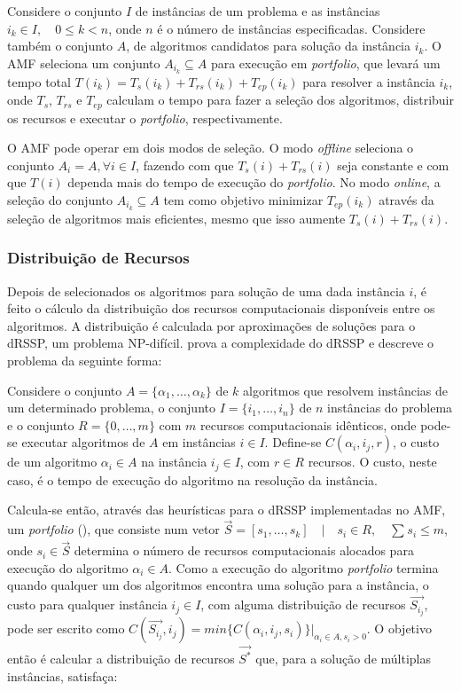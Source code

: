 \documentclass[a4paper, 12pt]{article}
\begin{document}
Considere o conjunto $I$ de instâncias de um problema e as instâncias $i_k \in
I, \quad 0 \leq k < n$, onde $n$ é o número de instâncias especificadas.
Considere também o conjunto $A$, de algoritmos candidatos para solução da
instância $i_k$. O AMF seleciona um conjunto $A_{i_k} \subseteq A$ para
execução em \emph{portfolio}, que levará um tempo total $T(i_k) =
T_s(i_k) + T_{rs}(i_k) + T_{ep}(i_k)$ para resolver a instância $i_k$,
onde $T_s$, $T_{rs}$ e $T_{ep}$ calculam o tempo para fazer a seleção
dos algoritmos, distribuir os recursos e executar o \emph{portfolio},
respectivamente.

O AMF pode operar em dois modos de seleção. O modo \emph{offline}
seleciona o conjunto $A_{i} = A, \forall i \in I$, fazendo com que
$T_s(i) + T_{rs}(i)$ seja constante e com que $T(i)$ dependa mais
do tempo de execução do \emph{portfolio}. No modo \emph{online},
a seleção do conjunto $A_{i_k} \subseteq A$ tem como objetivo minimizar
$T_{ep}(i_k)$ através da seleção de algoritmos mais eficientes, mesmo
que isso aumente $T_s(i) + T_{rs}(i)$.

\subsubsection{Distribuição de Recursos} \label{sec:drssp}

Depois de selecionados os algoritmos para solução de uma dada instância $i$,
é feito o cálculo da distribuição dos recursos computacionais disponíveis entre
os algoritmos. A distribuição é calculada por aproximações de soluções para
o dRSSP, um problema NP-difícil. \citet{bougeret2011approximating} prova a
complexidade do dRSSP e descreve o problema da seguinte forma:

Considere o conjunto $A = \{\alpha_1, \dots, \alpha_k\}$ de $k$ algoritmos que
resolvem instâncias de um determinado problema, o conjunto $I = \{i_1, \dots,
i_n\}$ de $n$ instâncias do problema e o conjunto $R = \{0, \dots, m\}$ com
$m$ recursos computacionais idênticos, onde pode-se executar algoritmos de $A$
em instâncias $i \in I$. Define-se $C(\alpha_i,i_j,r)$, o custo
de um algoritmo $\alpha_i \in A$ na instância $i_j \in I$, com $r \in R$
recursos. O custo, neste caso, é o tempo de execução do
algoritmo na resolução da instância.

Calcula-se então, através das heurísticas para o dRSSP implementadas no AMF,
um \emph{portfolio} (\citet{huberman1997economics}),
que consiste num vetor $\overrightarrow{S} = [s_1, \dots, s_k] \quad | \quad
s_i \in R, \quad \sum_{} s_i \leq m$, onde $s_i \in \overrightarrow{S}$
determina o número de recursos computacionais alocados para execução
do algoritmo $\alpha_i \in A$. Como a execução do algoritmo
\emph{portfolio} termina quando qualquer um dos algoritmos encontra
uma solução para a instância, o custo para qualquer instância
$i_j \in I$, com alguma distribuição de recursos $\overrightarrow{S_{i_j}}$,
pode ser escrito como $C(\overrightarrow{S_{i_j}}, i_j) =
min \{C(\alpha_i,i_j,s_i)\}|_{\alpha_i \in A, s_i > 0}$. O objetivo
então é calcular a distribuição de recursos $\overrightarrow{S^*}$
que, para a solução de múltiplas instâncias, satisfaça:
\end{document}
